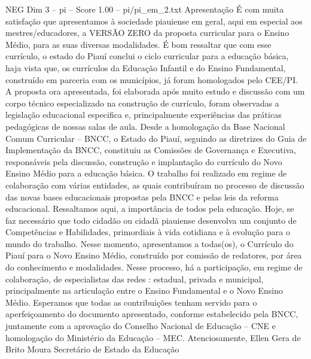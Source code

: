 \begin{textsample}{NEG Dim 3 – pi – Score 1.00 – pi/pi\_em\_2.txt}  \label{ex:f3_neg_038}
Apresentação É com muita satisfação que apresentamos à sociedade piauiense em geral, aqui em especial aos mestres/educadores, a VERSÃO ZERO da proposta curricular para o Ensino Médio, para as suas diversas modalidades.
É bom ressaltar que com esse currículo, o estado do Piauí conclui o ciclo curricular para a educação básica, haja vista que, os currículos da Educação Infantil e do Ensino Fundamental, construído em parceria com os municípios, já foram homologados pelo CEE/PI.
A proposta ora apresentada, foi elaborada após muito estudo e discussão com um corpo técnico especializado na construção de currículo, foram observadas a legislação educacional especifica e, principalmente experiências das práticas pedagógicas de nossas salas de aula.
Desde a homologação da Base Nacional Comum Curricular – BNCC, o Estado do Piauí, seguindo as diretrizes do Guia de Implementação da BNCC, constituiu as Comissões de Governança e Executiva, responsáveis pela discussão, construção e implantação do currículo do Novo Ensino Médio para a educação básica.
O trabalho foi realizado em regime de colaboração com várias entidades, as quais contribuíram no processo de discussão das novas bases educacionais propostas pela BNCC e pelas leis da reforma educacional.
Ressaltamos aqui, a importância de todos pela educação.
Hoje, se faz necessário que todo cidadão ou cidadã piauiense desenvolva um conjunto de Competências e Habilidades, primordiais à vida cotidiana e à evolução para o mundo do trabalho.
Nesse momento, apresentamos a todas(os), o Currículo do Piauí para o Novo Ensino Médio, construído por comissão de redatores, por área do conhecimento e modalidades.
Nesse processo, há a participação, em regime de colaboração, de especialistas das redes : estadual, privada e municipal, principalmente na articulação entre o Ensino Fundamental e o Novo Ensino Médio.
Esperamos que todas as contribuições tenham servido para o aperfeiçoamento do documento apresentado, conforme estabelecido pela BNCC, juntamente com a aprovação do Conselho Nacional de Educação – CNE e homologação do Ministério da Educação – MEC.
Atenciosamente, Ellen Gera de Brito Moura Secretário de Estado da Educação

\end{textsample}

